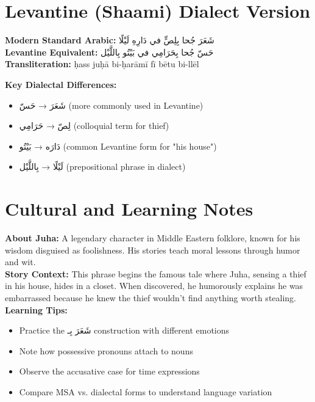 \documentclass[a4paper,12pt]{article}
\begin{document}
\section{Levantine (Shaami) Dialect Version}

\begin{tcolorbox}[colback=white,colframe=accentcolor]
\textbf{Modern Standard Arabic:}
\textarabic{شَعَرَ جُحا بِلِصٍّ في دَارِهِ لَيْلًا}
\\[1em]
\textbf{Levantine Equivalent:}
\textarabic{
حَسّ جُحا بِحَرَامِي في بَيْتُو بِاللَّيْل
}
\\[0.5em]
\textbf{Transliteration:} ḥass juḥā bi-ḥarāmī fī bētu bi-llēl
\end{tcolorbox}

\textbf{Key Dialectal Differences:}
\begin{itemize}
\item \textarabic{شَعَرَ} → \textarabic{حَسّ} (more commonly used in Levantine)
\item \textarabic{لِصّ} → \textarabic{حَرَامِي} (colloquial term for thief)
\item \textarabic{دَارَه} → \textarabic{بَيْتُو} (common Levantine form for "his house")
\item \textarabic{لَيْلًا} → \textarabic{بِاللَّيْل} (prepositional phrase in dialect)
\end{itemize}

\section{Cultural and Learning Notes}

\begin{tcolorbox}[colback=boxcolor,colframe=headercolor]
\textbf{About Juha:} A legendary character in Middle Eastern folklore, known for his wisdom disguised as foolishness. His stories teach moral lessons through humor and wit.
\\[1em]
\textbf{Story Context:} This phrase begins the famous tale where Juha, sensing a thief in his house, hides in a closet. When discovered, he humorously explains he was embarrassed because he knew the thief wouldn't find anything worth stealing.
\\[1em]
\textbf{Learning Tips:}
\begin{itemize}
\item Practice the \textarabic{شَعَرَ بِـ} construction with different emotions
\item Note how possessive pronouns attach to nouns
\item Observe the accusative case for time expressions
\item Compare MSA vs. dialectal forms to understand language variation
\end{itemize}
\end{tcolorbox}
\end{document}
